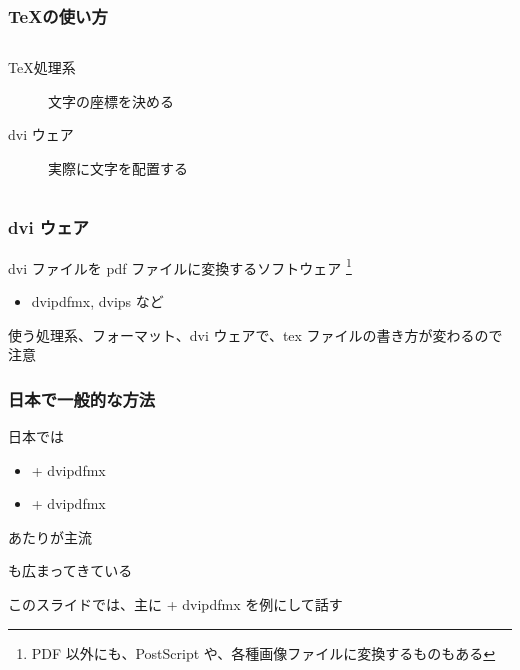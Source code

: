 \begin{frame}
	\frametitle{\TeX の使い方}
	\begin{columns}[c]
		\begin{column}{0.6\textwidth}
			\begin{description}
				\item[\TeX 処理系] 文字の座標を決める
				\item[dvi ウェア] 実際に文字を配置する
			\end{description}
		\end{column}
		\begin{column}{0.4\textwidth}
			\centering
		\end{column}
	\end{columns}
\end{frame}

\begin{frame}
	\frametitle{dvi ウェア}
	dvi ファイルを pdf ファイルに変換するソフトウェア
	\footnote{PDF 以外にも、PostScript や、各種画像ファイルに変換するものもある}
	\begin{itemize}
		\item dvipdfmx, dvips など
	\end{itemize}
	
	使う処理系、フォーマット、dvi ウェアで、tex ファイルの書き方が変わるので注意
\end{frame}

\begin{frame}
	\frametitle{日本で一般的な方法}
	日本では
	\begin{itemize}
		\item {\pLaTeX} + dvipdfmx
		\item {\upLaTeX} + dvipdfmx
	\end{itemize}
	あたりが主流
	
	\LuaLaTeX も広まってきている
	
	\pause
	このスライドでは、主に {\pLaTeX} + dvipdfmx を例にして話す
\end{frame}


